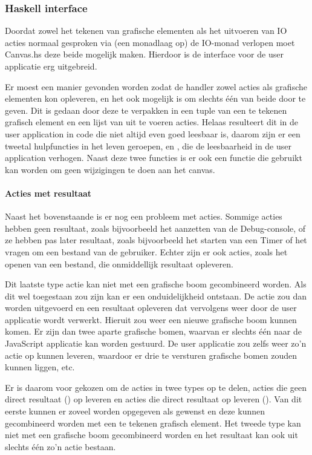 \subsubsection{Haskell interface}
Doordat zowel het tekenen van grafische elementen als het uitvoeren van IO acties normaal gesproken via (een monadlaag op) de IO-monad verlopen moet Canvas.hs deze beide mogelijk maken. Hierdoor is de interface voor de user applicatie erg uitgebreid. 

Er moest een manier gevonden worden zodat de handler zowel acties als grafische elementen kon opleveren, en het ook mogelijk is om slechts één van beide door te geven. Dit is gedaan door deze te verpakken in een tuple van een te tekenen grafisch element en een lijst van uit te voeren acties. Helaas resulteert dit in de user application in code die niet altijd even goed leesbaar is, daarom zijn er een tweetal hulpfuncties in het leven geroepen,  en , die de leesbaarheid in de user application verhogen. Naast deze twee functies is er ook een  functie die gebruikt kan worden om geen wijzigingen te doen aan het canvas.

\paragraph{Acties met resultaat}
Naast het bovenstaande is er nog een probleem met acties. Sommige acties hebben geen resultaat, zoals bijvoorbeeld het aanzetten van de Debug-console, of ze hebben pas later resultaat, zoals bijvoorbeeld het starten van een Timer of het vragen om een bestand van de gebruiker. Echter zijn er ook acties, zoals het openen van een bestand, die onmiddellijk resultaat opleveren. 

Dit laatste type actie kan niet met een grafische boom gecombineerd worden. Als dit wel toegestaan zou zijn kan er een onduidelijkheid ontstaan. De actie zou dan worden uitgevoerd en een resultaat opleveren dat vervolgens weer door de user applicatie wordt verwerkt. Hieruit zou weer een nieuwe grafische boom kunnen komen. Er zijn dan twee aparte grafische bomen, waarvan er slechts één naar de JavaScript applicatie kan worden gestuurd. De user applicatie zou zelfs weer zo'n actie op kunnen leveren, waardoor er drie te versturen grafische bomen zouden kunnen liggen, etc. 

Er is daarom voor gekozen om de acties in twee types op te delen, acties die geen direct resultaat () op leveren en acties die direct resultaat op leveren (). Van dit eerste kunnen er zoveel worden opgegeven als gewenst en deze kunnen gecombineerd worden met een te tekenen grafisch element. Het tweede type kan niet met een grafische boom gecombineerd worden en het resultaat kan ook uit slechts één zo'n actie bestaan. 

